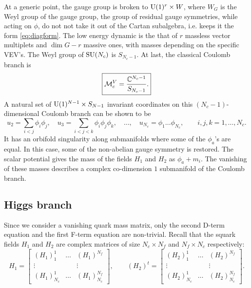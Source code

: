         At a generic point, the gauge group is broken to $\text{U}(1)^r\times W$, where $W_G$ is the Weyl group of the gauge group, the group of residual gauge symmetries, while acting on $\phi$, do not not take it out of the Cartan subalgebra, i.e. keeps it the form \eqref{eq:diagform}. The low energy dynamic is the that of $r$ massless vector multiplets and $\dim G-r$ massive ones, with masses depending on the specific VEV's. The Weyl group of $\text{SU}(N_c)$ is $S_{N_c-1}$. At last, the classical Coulomb branch is
        \begin{equation}
            \boxed{\mathcal{M}^V_c=\frac{\mathbb{C}^{N_c-1}}{S_{N_c-1}}.}
        \end{equation}
        A natural set of $\text{U}(1)^{N-1}\times S_{N-1}$ invariant coordinates on this $(N_c-1)$-dimensional Coulomb branch can be shown to be
        \begin{equation}
            u_2=\sum_{i<j}\phi_i\phi_j,\quad u_3=\sum_{i<j<k}\phi_i\phi_j\phi_k,\quad \dots,\quad u_{N_c}=\phi_1\dots \phi_{N_c}, \qquad i,j,k=1,\dots,N_c.
        \end{equation}
        It has an orbifold singularity along submanifolds where some of the $\phi_a$'s are equal. In this case, some of the non-abelian gauge symmetry is restored. The scalar potential gives the mass of the fields $H_1$ and $H_2$ as $\phi_a+m_i$. The vanishing of these masses describes a complex co-dimension $1$ submanifold of the Coulomb branch. 

    \subsection{Higgs branch}

        Since we consider a vanishing quark mass matrix, only the second D-term equation and the first F-term equation are non-trivial. Recall that the squark fields $H_1$ and $H_2$ are complex matrices of size $N_c\times N_f$ and $N_f\times N_c$ respectively:
        \begin{equation}
            H_1=
            \begin{bmatrix}
                (H_1)^1_1 & \dots & (H_1)^{N_f} \\
                \vdots & & \vdots \\
                (H_1)^1_{N_c} & \dots & (H_1)^{N_f}_{N_c}
            \end{bmatrix},\qquad
            (H_2)^t=
            \begin{bmatrix}
                (H_2)^1_1 & \dots & (H_2)^{N_f} \\
                \vdots & & \vdots \\
                (H_2)^1_{N_c} & \dots & (H_2)^{N_f}_{N_c}
            \end{bmatrix}.
        \end{equation}

